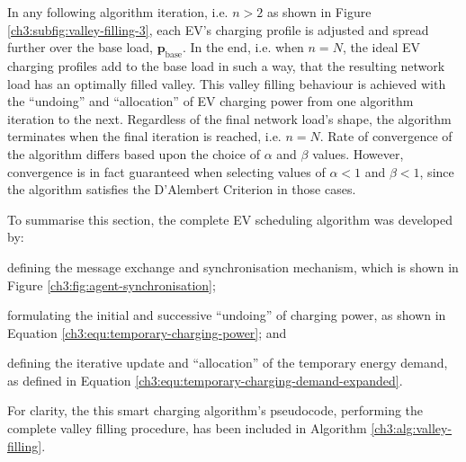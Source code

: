 In any following algorithm iteration, i.e. $n>2$ as shown in Figure \ref{ch3:subfig:valley-filling-3}, each EV's charging profile is adjusted and spread further over the base load, $\textbf{p}_\text{base}$.
In the end, i.e. when $n=N$, the ideal EV charging profiles add to the base load in such a way, that the resulting network load has an optimally filled valley.
This valley filling behaviour is achieved with the ``undoing'' and ``allocation'' of EV charging power from one algorithm iteration to the next.
Regardless of the final network load's shape, the algorithm terminates when the final iteration is reached, i.e. $n=N$.
Rate of convergence of the algorithm differs based upon the choice of $\alpha$ and $\beta$ values.
However, convergence is in fact guaranteed when selecting values of $\alpha < 1$ and $\beta < 1$, since the algorithm satisfies the D'Alembert Criterion in those cases.

To summarise this section, the complete EV scheduling algorithm was developed by: 
\begin{enumerate*}
	\item defining the message exchange and synchronisation mechanism, which is shown in Figure \ref{ch3:fig:agent-synchronisation};
	\item formulating the initial and successive ``undoing'' of charging power, as shown in Equation \ref{ch3:equ:temporary-charging-power}; and
	\item defining the iterative update and ``allocation'' of the temporary energy demand, as defined in Equation \ref{ch3:equ:temporary-charging-demand-expanded}.
\end{enumerate*}
For clarity, the this smart charging algorithm's pseudocode, performing the complete valley filling procedure, has been included in Algorithm \ref{ch3:alg:valley-filling}.















